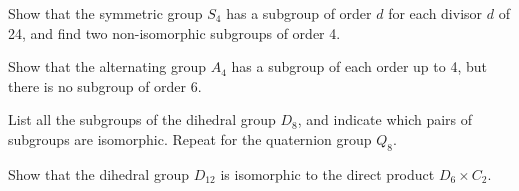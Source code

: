 
\begin{problem}
Show that the symmetric group $S_4$ has a subgroup of order $d$ for each divisor $d$ of 24, and find two
non-isomorphic subgroups of order 4.

Show that the alternating group $A_4$ has a subgroup of each order up to 4, but there is no subgroup of order 6.
\end{problem}

\begin{solution}[\bf Solution.]

\end{solution}


\begin{problem}
List all the subgroups of the dihedral group $D_8$, and indicate which pairs of subgroups are isomorphic. Repeat for the quaternion group $Q_8$.
\end{problem}

\begin{solution}[\bf Solution.]

\end{solution}


\begin{problem}
Show that the dihedral group $D_{12}$ is isomorphic to the direct product $D_6 \times C_2$.
\end{problem}

\begin{solution}[\bf Solution.]

\end{solution}


%

